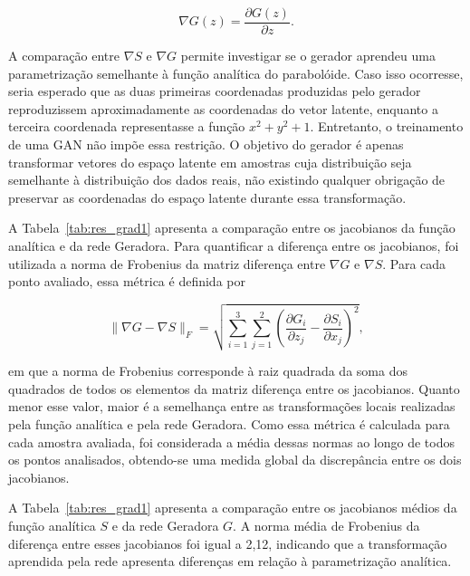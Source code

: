 \begin{equation}
\nabla G(z)=
\frac{\partial G(z)}{\partial z}.
\label{eq:jacobian_g}
\end{equation}

A comparação entre $\nabla S$ e $\nabla G$ permite investigar se o gerador aprendeu uma parametrização semelhante à função analítica do parabolóide. Caso isso ocorresse, seria esperado que as duas primeiras coordenadas produzidas pelo gerador reproduzissem aproximadamente as coordenadas do vetor latente, enquanto a terceira coordenada representasse a função $x^{2}+y^{2}+1$. Entretanto, o treinamento de uma GAN não impõe essa restrição. O objetivo do gerador é apenas transformar vetores do espaço latente em amostras cuja distribuição seja semelhante à distribuição dos dados reais, não existindo qualquer obrigação de preservar as coordenadas do espaço latente durante essa transformação.

A Tabela~\ref{tab:res_grad1} apresenta a comparação entre os jacobianos da função analítica e da rede Geradora. Para quantificar a diferença entre os jacobianos, foi utilizada a norma de Frobenius da matriz diferença entre $\nabla G$ e $\nabla S$. Para cada ponto avaliado, essa métrica é definida por

\begin{equation}
\|\nabla G - \nabla S\|_F
=
\sqrt{
\sum_{i=1}^{3}
\sum_{j=1}^{2}
\left(
\frac{\partial G_i}{\partial z_j}
-
\frac{\partial S_i}{\partial x_j}
\right)^2
},
\label{eq:frobenius}
\end{equation}

em que a norma de Frobenius corresponde à raiz quadrada da soma dos quadrados de todos os elementos da matriz diferença entre os jacobianos. Quanto menor esse valor, maior é a semelhança entre as transformações locais realizadas pela função analítica e pela rede Geradora. Como essa métrica é calculada para cada amostra avaliada, foi considerada a média dessas normas ao longo de todos os pontos analisados, obtendo-se uma medida global da discrepância entre os dois jacobianos.

A Tabela~\ref{tab:res_grad1} apresenta a comparação entre os jacobianos médios da função analítica $S$ e da rede Geradora $G$. A norma média de Frobenius da diferença entre esses jacobianos foi igual a 2,12, indicando que a transformação aprendida pela rede apresenta diferenças em relação à parametrização analítica.

